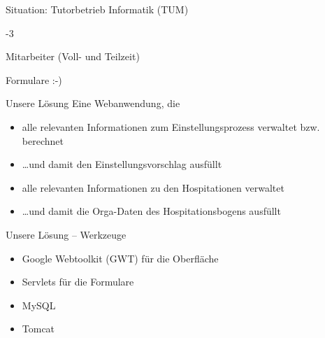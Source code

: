 \documentclass{beamer}
\newcommand{\LargeFact}[3][]{
	\vfill
	\begin{center}
		\ifthenelse{\equal{#1}{}}{}{\vspace{-5ex}#1\par\bigskip}
		{\fontsize{80}{80}\selectfont #2}\par
		\bigskip
		#3
	\end{center}
	\vfill
}
\begin{document}
\begin{frame}{Situation: Tutorbetrieb Informatik (TUM)}
	\LargeFact{2-3}{Mitarbeiter (Voll- und Teilzeit)}
\end{frame}

\begin{frame}{}
	\begin{center}
	\Huge Formulare :-)
	\end{center}
\end{frame}


\begin{frame}{Unsere Lösung}
Eine Webanwendung, die 
\begin{itemize}
	\item alle relevanten Informationen zum Einstellungsprozess verwaltet bzw. berechnet
	\item \ldots und damit den Einstellungsvorschlag ausfüllt
	\item alle relevanten Informationen zu den Hospitationen verwaltet
	\item \ldots und damit die Orga-Daten des Hospitationsbogens ausfüllt
\end{itemize}
\end{frame}

\begin{frame}{Unsere Lösung -- Werkzeuge}
\begin{itemize}
	\item Google Webtoolkit (GWT) für die Oberfläche
	\item Servlets für die Formulare
	\item MySQL
	\item Tomcat
\end{itemize}
\end{frame}
\end{document}
